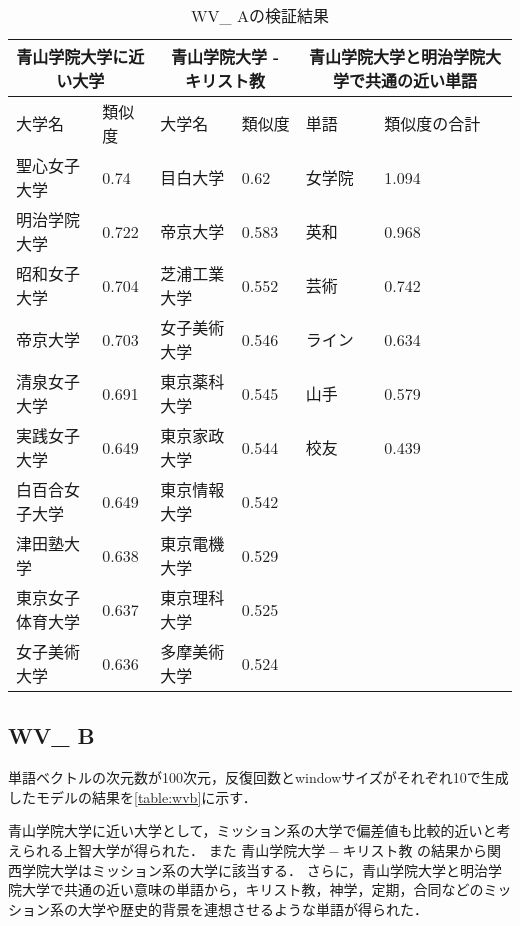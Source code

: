 \begin{table}[H]
\caption{WV\_ Aの検証結果}
\centering
\footnotesize
\begin{tabular}{ll|ll|ll}
\hline
\multicolumn{2}{c}{青山学院大学に近い大学} & \multicolumn{2}{c}{青山学院大学 - キリスト教} & \multicolumn{2}{c}{青山学院大学と明治学院大学で共通の近い単語}
\\ \hline
大学名 & 類似度 & 大学名 & 類似度 & 単語 & 類似度の合計
\\ \hline \hline
聖心女子大学 & 0.74 & 目白大学 & 0.62 & 女学院 & 1.094\\
明治学院大学 & 0.722 & 帝京大学 & 0.583 & 英和 & 0.968\\
昭和女子大学 & 0.704 & 芝浦工業大学 & 0.552 & 芸術 & 0.742\\
帝京大学 & 0.703 & 女子美術大学 & 0.546 & ライン & 0.634\\
清泉女子大学 & 0.691 & 東京薬科大学 & 0.545 & 山手 & 0.579\\
実践女子大学 & 0.649 & 東京家政大学 & 0.544 & 校友 & 0.439\\
白百合女子大学 & 0.649 & 東京情報大学 & 0.542 & & \\
津田塾大学 & 0.638 & 東京電機大学 & 0.529 & & \\
東京女子体育大学 & 0.637 & 東京理科大学 & 0.525 & & \\
女子美術大学 & 0.636 & 多摩美術大学 & 0.524 & & \\ \hline
\end{tabular}
\label{table:wva}
\end{table}



\subsection{WV\_ B}
単語ベクトルの次元数が100次元，反復回数とwindowサイズがそれぞれ10で生成したモデルの結果を\ref{table:wvb}に示す．

青山学院大学に近い大学として，ミッション系の大学で偏差値も比較的近いと考えられる上智大学が得られた．
また $ 青山学院大学 - キリスト教 $ の結果から関西学院大学はミッション系の大学に該当する．
さらに，青山学院大学と明治学院大学で共通の近い意味の単語から，キリスト教，神学，定期，合同などのミッション系の大学や歴史的背景を連想させるような単語が得られた．

